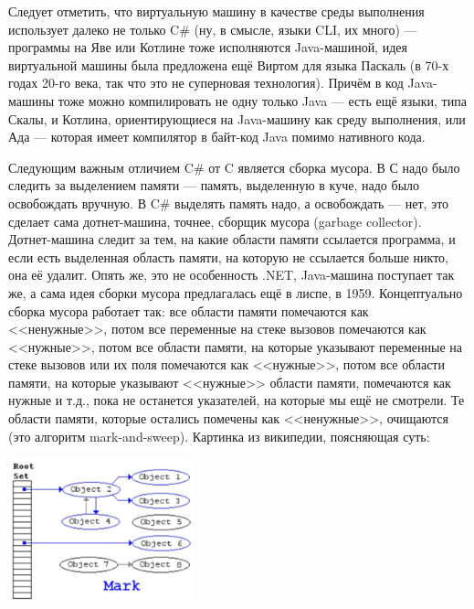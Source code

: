 \documentclass[a5paper]{article}
\begin{document}
Следует отметить, что виртуальную машину в качестве среды выполнения использует далеко не только C\# (ну, в смысле, языки CLI, их много) --- программы на Яве или Котлине тоже исполняются Java-машиной, идея виртуальной машины была предложена ещё Виртом для языка Паскаль (в 70-х годах 20-го века, так что это не суперновая технология). Причём в код Java-машины тоже можно компилировать не одну только Java --- есть ещё языки, типа Скалы, и Котлина, ориентирующиеся на Java-машину как среду выполнения, или Ада --- которая имеет компилятор в байт-код Java помимо нативного кода.

Следующим важным отличием C\# от C является сборка мусора. В С надо было следить за выделением памяти --- память, выделенную в куче, надо было освобождать вручную. В C\# выделять память надо, а освобождать --- нет, это сделает сама дотнет-машина, точнее, сборщик мусора (garbage collector). Дотнет-машина следит за тем, на какие области памяти ссылается программа, и если есть выделенная область памяти, на которую не ссылается больше никто, она её удалит. Опять же, это не особенность .NET, Java-машина поступает так же, а сама идея сборки мусора предлагалась ещё в лиспе, в 1959. Концептуально сборка мусора работает так: все области памяти помечаются как <<ненужные>>, потом все переменные на стеке вызовов помечаются как <<нужные>>, потом все области памяти, на которые указывают переменные на стеке вызовов или их поля помечаются как <<нужные>>, потом все области памяти, на которые указывают <<нужные>> области памяти, помечаются как нужные и т.д., пока не останется указателей, на которые мы ещё не смотрели. Те области памяти, которые остались помечены как <<ненужные>>, очищаются (это алгоритм mark-and-sweep). Картинка из википедии, поясняющая суть:

\begin{center}
    \includegraphics[width=0.4\textwidth]{markAndSweep.png}
\end{center}
\end{document}
